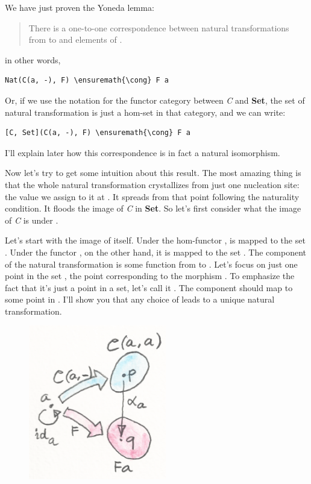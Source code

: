 We have just proven the Yoneda lemma:

\begin{quote}
There is a one-to-one correspondence between natural transformations
from  to  and elements of . 
\end{quote}
in other words,


\begin{Verbatim}[commandchars=\\\{\}]
Nat(C(a, -), F) \ensuremath{\cong} F a
\end{Verbatim}
Or, if we use the notation \code{{[}C, Set{]}} for the functor
category between \emph{C} and \textbf{Set}, the set of natural
transformation is just a hom-set in that category, and we can write:

\begin{Verbatim}[commandchars=\\\{\}]
[C, Set](C(a, -), F) \ensuremath{\cong} F a
\end{Verbatim}
I'll explain later how this correspondence is in fact a natural
isomorphism.

Now let's try to get some intuition about this result. The most amazing
thing is that the whole natural transformation crystallizes from just
one nucleation site: the value we assign to it at . It
spreads from that point following the naturality condition. It floods
the image of \emph{C} in \textbf{Set}. So let's first consider what the
image of \emph{C} is under .

Let's start with the image of  itself. Under the hom-functor
,  is mapped to the set .
Under the functor , on the other hand, it is mapped to the set
. The component of the natural transformation 
is some function from  to . Let's focus on
just one point in the set , the point corresponding to
the morphism . To emphasize the fact that it's just a point
in a set, let's call it . The component  should map
 to some point  in . I'll show you that
any choice of  leads to a unique natural transformation.

\begin{figure}[H]
\centering
\includegraphics[width=60mm]{images/yoneda3.png}
\end{figure}

